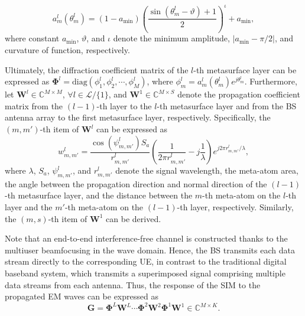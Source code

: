 \documentclass[conference]{IEEEtran}
\theoremstyle{remark}
\begin{document}
\begin{equation}\label{ap_model}
a_{m}^{l}\left( {\theta}_{m}^{l} \right)= \left(1-a_\text{min}\right) 
\left( \frac{\sin \left( {\theta}_{m}^{l} -\vartheta \right)+1 }{2} \right)^{\iota }+a_\text{min},
\end{equation} where constant $a_\text{min}$, $\vartheta$, and $\iota$ denote the minimum amplitude, $\left|a_\text{min}-\pi/2\right|$, and curvature of function, respectively.

Ultimately, the diffraction coefficient matrix of the $l$-th metasurface layer can be expressed as $\mathbf{\Phi}^{l}=\text{diag}\left( {\phi_{1}^{l}}, {\phi_{2}^{l}},\cdots,{\phi_{M}^{l}}\right)$, where ${\phi_{m}^{l}} =a_{m}^{l}( {\theta}_{m}^{l})e^{j{\theta}_{m}^{l}} $.
Furthermore, let $\mathbf{W}^{l}\in\mathbb{C}^{M\times M}$, $\forall l \in \mathcal{L} /\{1\}$, and $\mathbf{W}^{1}\in \mathbb{C}^{M\times S}$ denote the propagation coefficient matrix from the $(l-1)$-th layer to the $l$-th metasurface layer and from the BS antenna array to the first metasurface layer, respectively.
Specifically, the $(m,m')$-th item of $\mathbf{W}^{l}$ can be expressed as \cite{Group_An_SIM_JSAC}
\begin{equation}\label{RSDT}
{w_{m, m'}^{l}=\frac{\cos(\psi_{m,m'}^{l}) S_{a}}{r_{m,m'}^{l}}\left(\frac{1}{2 \pi r_{m,m'}^{l}}-j \frac{1}{\lambda}\right) e^{j 2 \pi {r_{m,m'}^{l}} / \lambda} },
\end{equation}
where $\lambda$, $S_{a}$, $\psi_{m, m'}^{l}$, and $r_{m, m'}^{l}$ denote the signal wavelength, the meta-atom area, the angle between the propagation direction and normal direction of the $(l-1)$-th metasurface layer, and the distance between the $m$-th meta-atom on the $l$-th layer and the $m'$-th meta-atom on the $(l-1)$-th layer, respectively.
Similarly, the $(m,s)$-th item of $\mathbf{W}^{1}$ can be derived.

Note that an end-to-end interference-free channel is constructed thanks to the multiuser beamfocusing in the wave domain. Hence, the BS transmits each data stream directly to the corresponding UE, in contrast to the traditional digital baseband system, which transmits a superimposed signal comprising multiple data streams from each antenna.
Thus, the response of the SIM to the propagated EM waves can be expressed as
\begin{equation}\label{SIM_Beamfocusing_matrix}
\mathbf{G}=\boldsymbol{\Phi}^{L} \mathbf{W}^{L} \cdots \boldsymbol{\Phi}^{2} \mathbf{W}^{2} \boldsymbol{\Phi}^{1} \mathbf{W}^{1} \in \mathbb{C}^{M \times K}.
\end{equation}
\end{document}
